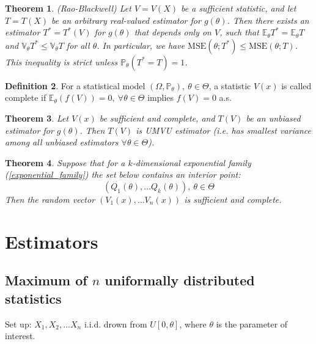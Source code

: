 \documentclass[12pt]{article}
\newtheorem{theorem}{Theorem}[section]
\theoremstyle{definition}
\newtheorem{definition}[theorem]{Definition}
\theoremstyle{remark}
\numberwithin{equation}{section}
\newcommand{\PP}{\mathbb{P}}
\newcommand{\EE}{\mathbb{E}}
\newcommand{\VV}{\mathbb{V}}
\begin{document}
\begin{theorem}\emph{(Rao-Blackwell)}
	Let $V = V(X)$ be a sufficient statistic, and let $T = T(X)$ be an arbitrary real-valued estimator for $g(\theta)$. Then there exists an estimator $T^* = T^*(V)$ for $g(\theta)$ that depends only on $V$, such that $\EE_\theta T^* = \EE_\theta T$ and $\VV_\theta T^* \leq \VV_\theta T$ for all $\theta$. In particular, we have $\text{MSE}(\theta; T^*) \leq \text{MSE}(\theta; T)$. This inequality is strict unless $\PP_\theta(T^* = T) = 1$.
\end{theorem}

\begin{definition}
For a statistical model $(\Omega, \PP_\theta), \ \theta \in \Theta$, a statistic $V(x)$	is called complete if $\EE_\theta(f(V)) = 0,\ \forall \theta\in \Theta$ implies $f(V)=0$ a.s.
\end{definition}

\begin{theorem}
	Let $V(x)$ be sufficient and complete, and $T(V)$ be an unbiased estimator for $g(\theta)$. Then $T(V)$ is UMVU estimator (i.e. has smallest variance among all unbiased estimators $\forall\theta\in\Theta$).
\end{theorem}

\begin{theorem}
	Suppose that for a $k$-dimensional exponential family (\ref{exponential_family}) the set below contains an interior point:
\begin{equation*}
	(Q_1(\theta),\ldots Q_k(\theta)),\ \theta\in\Theta
\end{equation*}
Then the random vector $\left(V_1(x),\ldots V_n(x)\right)$ is sufficient and complete.
\end{theorem}


\section{Estimators}

\subsection{Maximum of $n$ uniformally distributed statistics}

Set up: $X_1, X_2,\ldots X_n$ i.i.d. drown from $U[0, \theta]$, where $\theta$ is the parameter of interest.
\end{document}
